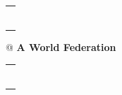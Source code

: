 \documentclass[11pt,a4paper]{article}
\author{Andreas Hemmetter}
\begin{document}
\pagestyle{fancyplain}
\fancyhf{}
\begin{center}

\begin{tabular}[t]{@{}l}
\rule[4pt]{0.22\linewidth}{4pt}
\end{tabular}
\begin{tabular}[t]{@{}}
\fontsize{24pt}{10pt}
\textbf{A World Federation}
\end{tabular}
\begin{tabular}[t]{r@{}}
\rule[4pt]{0.22\linewidth}{4pt}
\end{tabular}
\end{center}
\end{document}
